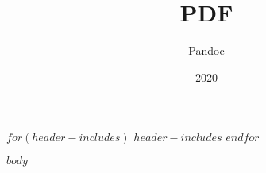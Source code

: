 \documentclass[$papersize$,$fontsize$]{desbeers-six-by-nine}
\title{PDF}
\author{Pandoc}
\date{2020}
\begin{document}
$for(header-includes)$
$header-includes$
$endfor$

\frontmatter

$body$
\end{document}
